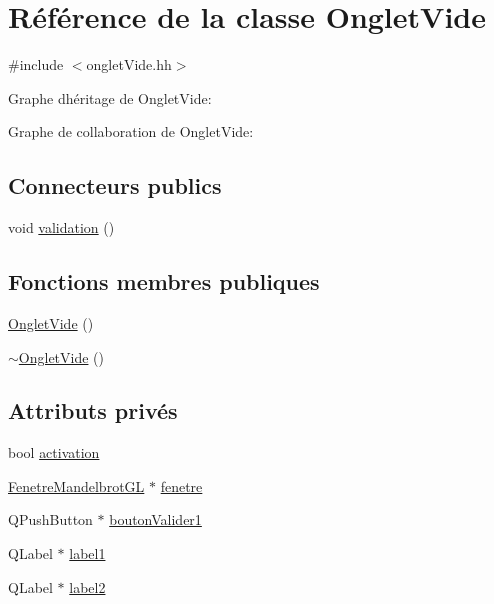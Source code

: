 \hypertarget{classOngletVide}{}\section{Référence de la classe Onglet\+Vide}
\label{classOngletVide}


{\ttfamily \#include $<$onglet\+Vide.\+hh$>$}



Graphe d\textquotesingle{}héritage de Onglet\+Vide\+:


Graphe de collaboration de Onglet\+Vide\+:
\subsection*{Connecteurs publics}
\begin{DoxyCompactItemize}
\item 
void \hyperlink{classOngletVide_a59177a1d6c3bc02c6799bcbfd30b56c3}{validation} ()
\end{DoxyCompactItemize}
\subsection*{Fonctions membres publiques}
\begin{DoxyCompactItemize}
\item 
\hyperlink{classOngletVide_a09afab8766973faa9c084cd06514c8de}{Onglet\+Vide} ()
\item 
\hyperlink{classOngletVide_a94260df1af9c0290acee39ffef24572a}{$\sim$\+Onglet\+Vide} ()
\end{DoxyCompactItemize}
\subsection*{Attributs privés}
\begin{DoxyCompactItemize}
\item 
bool \hyperlink{classOngletVide_abb27f7ff5e53d2dcf3889ba758ecf182}{activation}
\item 
\hyperlink{classFenetreMandelbrotGL}{Fenetre\+Mandelbrot\+GL} $\ast$ \hyperlink{classOngletVide_ad7d2c25286ebf7213a97e36d0a21a3a6}{fenetre}
\item 
Q\+Push\+Button $\ast$ \hyperlink{classOngletVide_aa04073ea6bc8d821d9977a1f79869b7e}{bouton\+Valider1}
\item 
Q\+Label $\ast$ \hyperlink{classOngletVide_a7e085f321d5ad309660e3d23ebb5664e}{label1}
\item 
Q\+Label $\ast$ \hyperlink{classOngletVide_af334ad6ead863ce00f5f892215d9ceb5}{label2}
\end{DoxyCompactItemize}


